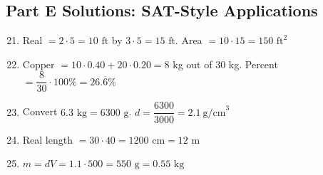 \documentclass[14pt]{extarticle}
\begin{document}
\subsection*{Part E Solutions: SAT-Style Applications}
\begin{enumerate}
  \setcounter{enumi}{20}
  \item Real \(=2\cdot5=10\text{ ft}\) by \(3\cdot5=15\text{ ft}\). Area \(=10\cdot15=\boxed{150\text{ ft}^2}\)
  \item Copper \(=10\cdot0.40+20\cdot0.20=8\) kg out of \(30\) kg. Percent \(=\dfrac{8}{30}\cdot100\%=\boxed{26.\overline{6}\%}\)
  \item Convert \(6.3\text{ kg}=6300\text{ g}\). \(d=\dfrac{6300}{3000}=\boxed{2.1\ \text{g/cm}^3}\)
  \item Real length \(=30\cdot40=1200\text{ cm}= \boxed{12\text{ m}}\)
  \item \(m=dV=1.1\cdot500=\boxed{550\text{ g}}=\boxed{0.55\text{ kg}}\)
\end{enumerate}





\end{document}
